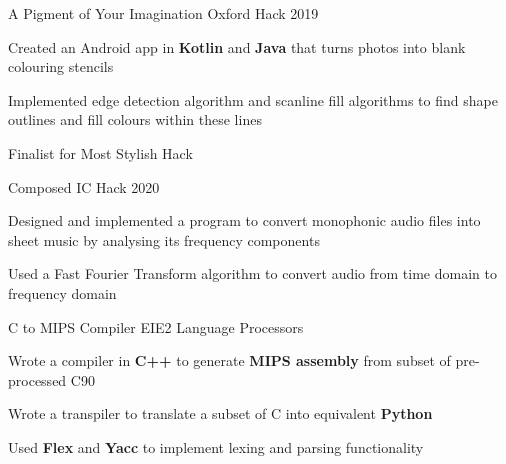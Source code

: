 

\begin{cvprojects}


  \cvproject
  {A Pigment of Your Imagination} %
  {Oxford Hack 2019} %
  {
    \begin{cvitems} %
      \item Created an Android app in \textbf{Kotlin} and \textbf{Java} that turns photos into blank colouring stencils
      \item Implemented edge detection algorithm and scanline fill algorithms to find shape outlines and fill colours within these lines
      \item Finalist for Most Stylish Hack
    \end{cvitems}
  }

  \cvproject
    {Composed} %
    {IC Hack 2020} %
    { %
        \begin{cvitems}
            \item Designed and implemented a program to convert monophonic audio files into sheet music by analysing its frequency components
            \item Used a Fast Fourier Transform algorithm to convert audio from time domain to frequency domain
        \end{cvitems}
    }

    \cvproject
    {C to MIPS Compiler}
    {EIE2 Language Processors}
    {
        \begin{cvitems}
            \item Wrote a compiler in \textbf{C++} to generate \textbf{MIPS assembly} from subset of pre-processed C90
            \item Wrote a transpiler to translate a subset of C into equivalent \textbf{Python}
            \item Used \textbf{Flex} and \textbf{Yacc} to implement lexing and parsing functionality
        \end{cvitems}
    }


\end{cvprojects}
